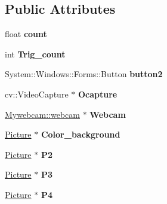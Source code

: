 \subsection*{Public Attributes}
\begin{DoxyCompactItemize}
\item 
\mbox{\label{class_glasses_1_1_my_form_ac2d6ebfec73cda1358c34014cd02d994}} 
float {\bfseries count}
\item 
\mbox{\label{class_glasses_1_1_my_form_a97b2d0658f07258e7f91775eeef8766e}} 
int {\bfseries Trig\+\_\+count}
\item 
\mbox{\label{class_glasses_1_1_my_form_a8e0e2720911360b59e361b6f3edca569}} 
System\+::\+Windows\+::\+Forms\+::\+Button {\bfseries button2}
\item 
\mbox{\label{class_glasses_1_1_my_form_ae84ad56e8ecc0b9fcb64829919cfbd46}} 
cv\+::\+Video\+Capture $\ast$ {\bfseries Ocapture}
\item 
\mbox{\label{class_glasses_1_1_my_form_aac1c500fc180c8cae69ae076a83887d3}} 
\hyperlink{class_mywebcam_1_1webcam}{Mywebcam\+::webcam} $\ast$ {\bfseries Webcam}
\item 
\mbox{\label{class_glasses_1_1_my_form_aaefd870b246b7b814f26eaa780506ae1}} 
\hyperlink{class_my_picture_1_1_picture}{Picture} $\ast$ {\bfseries Color\+\_\+background}
\item 
\mbox{\label{class_glasses_1_1_my_form_ab2cabc2027e4afa8cd5a59522980d424}} 
\hyperlink{class_my_picture_1_1_picture}{Picture} $\ast$ {\bfseries P2}
\item 
\mbox{\label{class_glasses_1_1_my_form_a42359605a4677680113fa2737a46b656}} 
\hyperlink{class_my_picture_1_1_picture}{Picture} $\ast$ {\bfseries P3}
\item 
\mbox{\label{class_glasses_1_1_my_form_a459ce91e11049dba48ae788ee75cefe7}} 
\hyperlink{class_my_picture_1_1_picture}{Picture} $\ast$ {\bfseries P4}
\item 

\end{DoxyCompactItemize}
